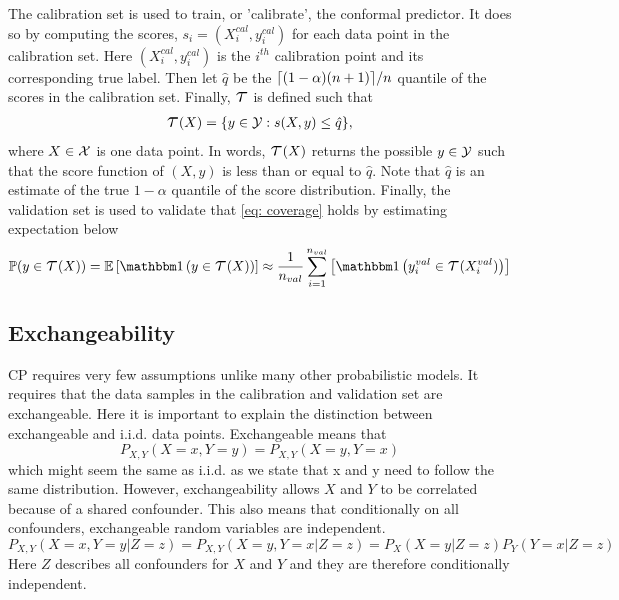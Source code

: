 The calibration set is used to train, or 'calibrate', the conformal predictor. It does so by computing the scores, $s_i = (X^{cal}_i, y^{cal}_i)$ for each data point in the calibration set. Here $(X^{cal}_i, y^{cal}_i)$ is the $i^{th}$ calibration point and its corresponding true label. Then let $\hat q$ be the $\lceil {(1-\alpha)(n+1)} \rceil/n$ quantile of the scores in the calibration set. Finally, $\Tau$ is defined such that 
\begin{gather}
\Tau(X) = \{y\in\Y : s(X,y) \leq \hat q\},
\label{eq: def. prediction set}
\end{gather}
where $X\in\mathcal{X}$ is one data point. In words, $\Tau(X)$ returns the possible $y\in\mathcal{Y}$ such that the score function of $(X,y)$ is less than or equal to $\hat q$. Note that $\hat q$ is an estimate of the true $1-\alpha$ quantile of the score distribution. Finally, the validation set is used to validate that \cref{eq: coverage} holds by estimating expectation below
\begin{gather}
    \doubleP(y\in\Tau(X)) = \doubleE\left[\doubleOne\left(y\in\Tau(X)\right)\right] \approx \frac{1}{n_{val}}\sum_{i=1}^{n_{val}}\left[\doubleOne\left(y^{val}_i\in\Tau(X^{val}_i)\right)\right]
    \label{eq: coverage expactation}
\end{gather}

% 
%
\subsection*{Exchangeability}
CP requires very few assumptions unlike many other probabilistic models. It requires that the data samples in the calibration and validation set are exchangeable. Here it is important to explain the distinction between exchangeable and i.i.d. data points. Exchangeable means that 
\[
P_{X, Y}(X=x, Y=y) = P_{X, Y}(X=y, Y=x)
\]
which might seem the same as i.i.d. as we state that x and y need to follow the same distribution. However, exchangeability allows $X$ and $Y$ to be correlated because of a shared confounder. This also means that conditionally on all confounders, exchangeable random variables are independent.
\[
P_{X, Y}(X=x, Y=y|Z=z) = P_{X, Y}(X=y, Y=x|Z=z) = P_{X}(X=y|Z=z)P_{Y}(Y=x|Z=z)
\]
Here $Z$ describes all confounders for $X$ and $Y$ and they are therefore conditionally independent. 
%
%
